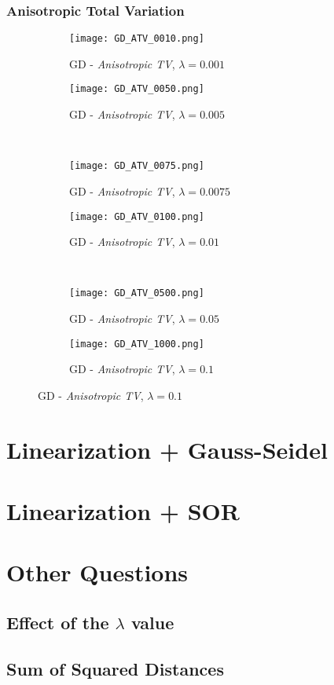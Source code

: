 \documentclass{report}
\begin{document}
			\subsubsection*{Anisotropic Total Variation}
			\begin{figure}[H] \renewcommand\thesubfigure{GD.ATV.\arabic{subfigure}}
				\centering
				\begin{subfigure}[b]{0.45\textwidth}
					\texttt{[image: GD\_ATV\_0010.png]}
					\caption{GD - \textit{Anisotropic TV}, $\lambda = 0.001$}
					\label{fig:GD_ATV001}
				\end{subfigure}
				\begin{subfigure}[b]{0.45\textwidth}
					\texttt{[image: GD\_ATV\_0050.png]}
					\caption{GD - \textit{Anisotropic TV}, $\lambda = 0.005$}
					\label{fig:GD_ATV005}
				\end{subfigure}
				\\
				\centering
				\begin{subfigure}[b]{0.45\textwidth}
					\texttt{[image: GD\_ATV\_0075.png]}
					\caption{GD - \textit{Anisotropic TV}, $\lambda = 0.0075$}
					\label{fig:GD_ATV0075}
				\end{subfigure}
				\begin{subfigure}[b]{0.45\textwidth}
					\texttt{[image: GD\_ATV\_0100.png]}
					\caption{GD - \textit{Anisotropic TV}, $\lambda = 0.01$}
					\label{fig:GD_ATV01}
				\end{subfigure}
				\\
				\centering
				\begin{subfigure}[b]{0.45\textwidth}
					\texttt{[image: GD\_ATV\_0500.png]}
					\caption{GD - \textit{Anisotropic TV}, $\lambda = 0.05$}
					\label{fig:GD_ATV05}
				\end{subfigure}
				\begin{subfigure}[b]{0.45\textwidth}
					\texttt{[image: GD\_ATV\_1000.png]}
					\caption{GD - \textit{Anisotropic TV}, $\lambda = 0.1$}
					\label{fig:GD_ATV1}
				\end{subfigure}
			\end{figure}
		\closesection
	\closesection
	\newpage
	
	\section{Linearization + Gauss-Seidel}
	\startsection
	\closesection
	
	\section{Linearization + SOR}
	\startsection
	\closesection
	
	\section{Other Questions}
	\startsection
		\subsection{Effect of the $\lambda$ value}
		\startsubsection
		\closesection
		\subsection{Sum of Squared Distances}
		\startsubsection
		\closesection
	\closesection
\end{document}
